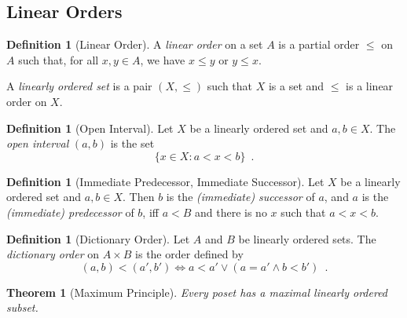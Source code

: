 \documentclass{book}
\newtheorem{thm}[ax]{Theorem}
\theoremstyle{definition}
\newtheorem{df}[ax]{Definition}
\begin{document}
\subsection{Linear Orders}

\begin{df}[Linear Order]
A \emph{linear order} on a set $A$ is a partial order $\leq$ on $A$ such that, for all $x,y \in A$, we have $x \leq y$ or $y \leq x$.

A \emph{linearly ordered set} is a pair $(X, \leq)$ such that $X$ is a set and $\leq$ is a linear order on $X$.
\end{df}

\begin{df}[Open Interval]
Let $X$ be a linearly ordered set and $a,b \in X$. The \emph{open interval} $(a,b)$ is the set
\[ \{ x \in X : a < x < b \} \enspace . \]
\end{df}

\begin{df}[Immediate Predecessor, Immediate Successor]
Let $X$ be a linearly ordered set and $a,b \in X$. Then $b$ is the \emph{(immediate) successor} of $a$, and $a$ is the \emph{(immediate) predecessor} of $b$, iff $a < B$ and there is no $x$ such that $a < x < b$.
\end{df}

\begin{df}[Dictionary Order]
Let $A$ and $B$ be linearly ordered sets. The \emph{dictionary order} on $A \times B$ is the order defined by
\[ (a,b) < (a',b') \Leftrightarrow a < a' \vee (a = a' \wedge b < b') \enspace . \]
\end{df}

\begin{thm}[Maximum Principle]
Every poset has a maximal linearly ordered subset.
\end{thm}
\end{document}
